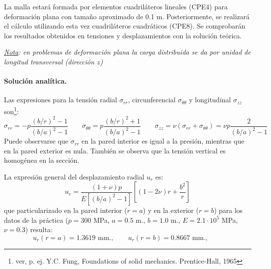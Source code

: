 \documentclass[a4paper,12pt]{article}
\begin{document}
La malla estará formada por elementos cuadriláteros lineales (CPE4) para deformación plana con tamaño aproximado de 0.1 m. Posteriormente, se realizará el cálculo utilizando esta vez cuadriláteros cuadráticos (CPE8). Se comprobarán los resultados obtenidos en tensiones y desplazamientos con la solución teórica.

\noindent

\vspace{4mm}
{\em \underline {Nota}: en problemas de deformación plana
la carga distribuida se da por unidad de longitud transversal
(dirección $z$)}

\paragraph{Solución analítica.}   Las expresiones para la 
tensión radial $\sigma_{rr}$,
circunferencial $\sigma_{\theta \theta}$ y longitudinal $\sigma_{zz}$ 
son\footnote{ver, p. ej. Y.C. Fung, Foundations of solid mechanics. Prentice-Hall, 1965}:
\begin{equation*} 
\sigma_{rr}=-p \frac{{( b/r) }^2 -1}
{{( b/a)}^2 -1} \qquad 
\sigma_{\theta \theta}=
p \frac{{( b/r) }^2 +1}
{{( b/a)}^2 -1} \qquad 
\sigma_{zz}=\nu(\sigma_{rr}+\sigma_{\theta \theta})
=\nu p \frac{2}
{{( b/a)}^2 -1}
\end{equation*} 
Puede observarse que $\sigma_{rr}$ en la pared interior es igual
a la presión, mientras que en la pared exterior es nula.  También se
observa que la tensión vertical es homogénea en la sección.

La expresión general del desplazamiento radial $u_r$ es:
\begin{equation*}
u_r=\frac{(1+\nu)p}{E [{(b/a)}^2-1 ]} \left [ 
(1-2 \nu) r +\frac{b^2}{r} \right ] 
\end{equation*}
que particularizado en la pared interior ($r=a$) y en la exterior ($r=b$)
para los datos de la práctica ($p=300$ MPa, $a=0.5$ m., $b=1.0$ m., 
$E=2.1 \cdot 10^5$ MPa, $\nu=0.3$) resulta:
\begin{equation*}
u_r(r=a)=1.3619 \textrm{ mm.},\qquad
u_r(r=b)=0.8667 \textrm{ mm.},\qquad
\end{equation*}
\end{document}
